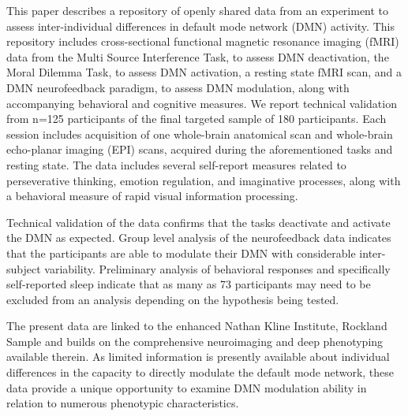 This paper describes a repository of openly shared data from an experiment to assess inter-individual differences in default mode network (DMN) activity. This repository includes cross-sectional functional magnetic resonance imaging (fMRI) data from the Multi Source Interference Task, to assess DMN deactivation, the Moral Dilemma Task, to assess DMN activation, a resting state fMRI scan, and a DMN neurofeedback paradigm, to assess DMN modulation, along with accompanying behavioral and cognitive measures. We report technical validation from n=125 participants of the final targeted sample of 180 participants. Each session includes acquisition of one whole-brain anatomical scan and whole-brain echo-planar imaging (EPI) scans, acquired during the aforementioned tasks and resting state. The data includes several self-report measures related to perseverative thinking, emotion regulation, and imaginative processes, along with a behavioral measure of rapid visual information processing. 

Technical validation of the data confirms that the tasks deactivate and activate the DMN as expected. Group level analysis of the neurofeedback data indicates that the participants are able to modulate their DMN with considerable inter-subject variability. Preliminary analysis of behavioral responses and specifically self-reported sleep indicate that as many as 73 participants may need to be excluded from an analysis depending on the hypothesis being tested. 

The present data are linked to the enhanced Nathan Kline Institute, Rockland Sample and builds on the comprehensive neuroimaging and deep phenotyping available therein. As limited information is presently available about individual differences in the capacity to directly modulate the default mode network, these data provide a unique opportunity to examine DMN modulation ability in relation to numerous phenotypic characteristics. 
